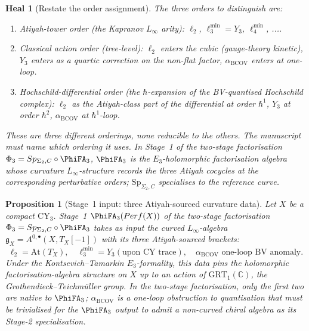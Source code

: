 \documentclass[11pt]{article}
\newtheorem{proposition}[theorem]{Proposition}
\newtheorem{heal}[theorem]{Heal}
\providecommand{\At}{\mathrm{At}}
\providecommand{\CY}{\mathrm{CY}}
\providecommand{\BCOV}{\mathrm{BCOV}}
\providecommand{\Perf}{\mathrm{Perf}}
\providecommand{\CC}{\mathbb{C}}
\providecommand{\Sp}{\mathrm{Sp}}
\begin{document}
\begin{heal}[Restate the order assignment]
\label{heal:5}
The three orders to distinguish are:
\begin{enumerate}
\item \emph{Atiyah-tower order} (the Kapranov $L_\infty$ arity):
$\ell_2$, $\ell_3^{\min} = Y_3$, $\ell_4^{\min}$, ....
\item \emph{Classical action order} (tree-level): $\ell_2$ enters the
cubic (gauge-theory kinetic), $Y_3$ enters as a quartic correction on
the non-flat factor, $\alpha_\BCOV$ enters at one-loop.
\item \emph{Hochschild-differential order} (the $\hbar$-expansion of
the BV-quantised Hochschild complex): $\ell_2$ as the Atiyah-class part
of the differential at order $\hbar^1$, $Y_3$ at order $\hbar^2$,
$\alpha_\BCOV$ at $\hbar^1$-loop.
\end{enumerate}
These are three different orderings, none reducible to the others. The
manuscript must name which ordering it uses. In Stage~1 of the
two-stage factorisation $\Phi_3 = \Sp_{\Sigma_2, C} \circ \PhiFA_3$,
$\PhiFA_3$ is the $E_3$-holomorphic factorisation algebra whose
curvature $L_\infty$-structure records the three Atiyah cocycles at the
corresponding perturbative orders; $\Sp_{\Sigma_2, C}$ specialises to
the reference curve.
\end{heal}

\begin{proposition}[Stage~1 input: three Atiyah-sourced curvature data]
\label{prop:stage-1-input}
Let $X$ be a compact $\CY_3$. Stage~1 $\PhiFA_3(\Perf(X))$ of the
two-stage factorisation $\Phi_3 = \Sp_{\Sigma_2, C} \circ \PhiFA_3$
takes as input the curved $L_\infty$-algebra $\mathfrak g_X = A^{0,
\bullet}(X, T_X[-1])$ with its three Atiyah-sourced brackets:
\[
  \ell_2 = \At(T_X), \quad \ell_3^{\min} = Y_3 (\text{upon CY trace}),
    \quad \alpha_\BCOV \text{ one-loop BV anomaly}.
\]
Under the Kontsevich--Tamarkin $E_3$-formality, this data pins the
holomorphic factorisation-algebra structure on $X$ up to an action of
$\mathrm{GRT}_1(\CC)$, the Grothendieck--Teichm\"uller group. In the
two-stage factorisation, only the first two are native to $\PhiFA_3$;
$\alpha_\BCOV$ is a one-loop obstruction to quantisation that must be
trivialised for the $\PhiFA_3$ output to admit a non-curved chiral
algebra as its Stage-2 specialisation.
\end{proposition}

\end{document}
